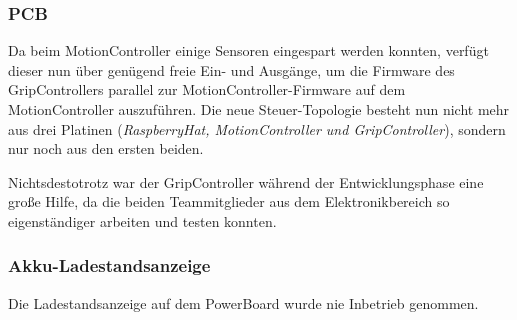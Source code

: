 \documentclass[main.tex]{subfiles} %
\begin{document}
\subsubsection*{PCB}

Da beim MotionController einige Sensoren eingespart werden konnten, verfügt
dieser nun über genügend freie Ein- und Ausgänge, um die Firmware des
GripControllers parallel zur MotionController-Firmware auf dem MotionController
auszuführen. Die neue Steuer-Topologie besteht nun nicht mehr aus drei Platinen
(\textit{RaspberryHat, MotionController und GripController}), sondern nur noch
aus den ersten beiden.

Nichtsdestotrotz war der GripController während der Entwicklungsphase eine
große Hilfe, da die beiden Teammitglieder aus dem Elektronikbereich so
eigenständiger arbeiten und testen konnten.

\subsubsection*{Akku-Ladestandsanzeige}

Die Ladestandsanzeige auf dem PowerBoard wurde nie Inbetrieb genommen.
\end{document}
